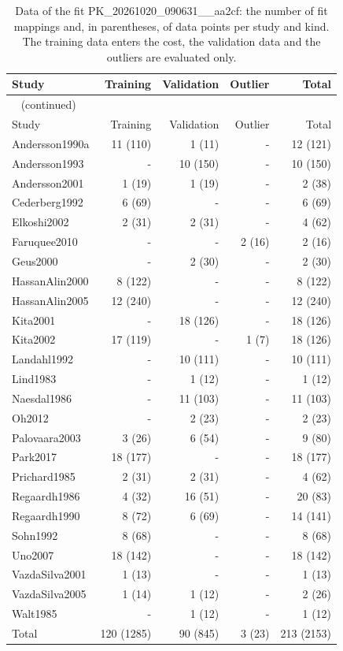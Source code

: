 \documentclass{article}
\begin{document}
\begin{longtable}{lrrrr}
\caption{Data of the fit PK\_20261020\_090631\_\_aa2cf: the number of fit mappings and, in parentheses, of data points per study and kind. The training data enters the cost, the validation data and the outliers are evaluated only.}\label{tab:data:PK_20261020_090631__aa2cf} \\
\toprule
Study & Training & Validation & Outlier & Total \\
\midrule
\endfirsthead
\multicolumn{5}{l}{\small\tablename~\thetable{} (continued)} \\
\toprule
Study & Training & Validation & Outlier & Total \\
\midrule
\endhead
\bottomrule
\endlastfoot
Andersson1990a & 11 (110) & 1 (11) & - & 12 (121) \\
Andersson1993 & - & 10 (150) & - & 10 (150) \\
Andersson2001 & 1 (19) & 1 (19) & - & 2 (38) \\
Cederberg1992 & 6 (69) & - & - & 6 (69) \\
Elkoshi2002 & 2 (31) & 2 (31) & - & 4 (62) \\
Faruquee2010 & - & - & 2 (16) & 2 (16) \\
Geus2000 & - & 2 (30) & - & 2 (30) \\
HassanAlin2000 & 8 (122) & - & - & 8 (122) \\
HassanAlin2005 & 12 (240) & - & - & 12 (240) \\
Kita2001 & - & 18 (126) & - & 18 (126) \\
Kita2002 & 17 (119) & - & 1 (7) & 18 (126) \\
Landahl1992 & - & 10 (111) & - & 10 (111) \\
Lind1983 & - & 1 (12) & - & 1 (12) \\
Naesdal1986 & - & 11 (103) & - & 11 (103) \\
Oh2012 & - & 2 (23) & - & 2 (23) \\
Palovaara2003 & 3 (26) & 6 (54) & - & 9 (80) \\
Park2017 & 18 (177) & - & - & 18 (177) \\
Prichard1985 & 2 (31) & 2 (31) & - & 4 (62) \\
Regaardh1986 & 4 (32) & 16 (51) & - & 20 (83) \\
Regaardh1990 & 8 (72) & 6 (69) & - & 14 (141) \\
Sohn1992 & 8 (68) & - & - & 8 (68) \\
Uno2007 & 18 (142) & - & - & 18 (142) \\
VazdaSilva2001 & 1 (13) & - & - & 1 (13) \\
VazdaSilva2005 & 1 (14) & 1 (12) & - & 2 (26) \\
Walt1985 & - & 1 (12) & - & 1 (12) \\
Total & 120 (1285) & 90 (845) & 3 (23) & 213 (2153) \\
\end{longtable}
\end{document}
